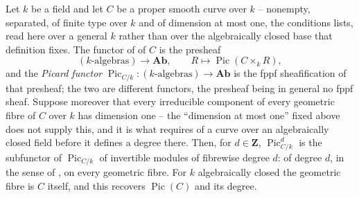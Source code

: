 \begin{definition}
\label{def:pcb-picard-functor}
Let \(k\) be a field and let \(C\) be a proper smooth curve over
\(k\) -- nonempty, separated, of finite type over \(k\) and of
dimension at most one, the conditions  lists, read
here over a general \(k\) rather than over the algebraically closed base
that definition fixes.  The functor of
 of \(C\) is the
presheaf
\[
 (k\text{-algebras})\longrightarrow\mathbf{Ab},
 \qquad R\longmapsto\operatorname{Pic}(C\times_kR),
\]
and the \emph{Picard functor}
\(\operatorname{Pic}_{C/k}:(k\text{-algebras})\longrightarrow\mathbf{Ab}\)
is the fppf sheafification of that presheaf; the two are different
functors, the presheaf being in general no fppf sheaf.  Suppose
moreover that every irreducible component of every geometric fibre of
\(C\) over \(k\) has dimension one -- the ``dimension at most one''
fixed above does not supply this, and it is what 
requires of a curve over an algebraically closed field before it
defines a degree there.  Then, for \(d\in\mathbf Z\),
\(\operatorname{Pic}^d_{C/k}\) is the subfunctor of
\(\operatorname{Pic}_{C/k}\) of invertible modules of fibrewise
degree \(d\): of degree \(d\), in the sense of ,
on every geometric fibre.  For \(k\) algebraically closed the
geometric fibre is \(C\) itself, and this recovers
\(\operatorname{Pic}(C)\) and its degree.
\end{definition}

